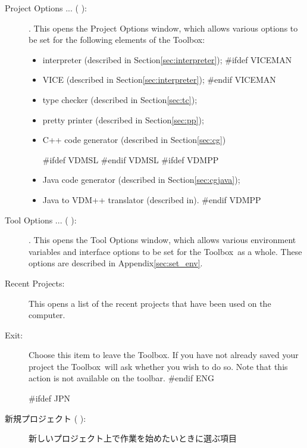 \documentclass[\pformat,12pt]{article}
\newcommand{\Toolbox}{Toolbox}
\newcommand{\Toolbox}{Toolbox}
\newcommand{\guicmd}[1]{{\sf #1}}
\newcommand{\guicmd}[1]{{\gt #1}}
\begin{document}
\begin{description}
\item[\guicmd{Project Options ...} (\hspace{-1.5mm}
):].
  This opens the \guicmd{Project Options} window, which allows various options
  to be set for the following elements of the \Toolbox:
  \begin{itemize}
    \item \guicmd{interpreter} (described in
  Section\ref{sec:interpreter});
#ifdef VICEMAN
    \item \guicmd{VICE} (described in
  Section\ref{sec:interpreter});
#endif VICEMAN
    \item \guicmd{type checker}  (described in Section\ref{sec:tc});
    \item \guicmd{pretty printer}  (described in Section\ref{sec:pp});
    \item \guicmd{C++ code generator} (described in Section\ref{sec:cg})%

#ifdef VDMSL
#endif VDMSL
#ifdef VDMPP
    \item \guicmd{Java code generator}  (described in Section\ref{sec:cgjava});
    \item \guicmd{Java to VDM++ translator}  (described in\cite{Java2VDMMan-CSK}). 
#endif VDMPP
  \end{itemize}

\item[\guicmd{Tool Options ...} (\hspace{-1.5mm}
):].
  This opens the \guicmd{Tool Options} window, which allows various
  environment variables and interface options to be set for the
  \Toolbox\ as a whole. These options are described in
  Appendix\ref{sec:set_env}. 

\item[\guicmd{Recent Projects}:]
  This opens a list of the recent projects that have been used on the
  computer.

\item[\guicmd{Exit}:] Choose this item to leave the \Toolbox. If you
  have not already saved your project the \Toolbox\ will ask whether
  you wish to do so. Note that this action is not available on the
  toolbar. 
#endif ENG

#ifdef JPN
\item[\guicmd{新規プロジェクト} (\hspace{-1.8mm}
):]
  新しいプロジェクト上で作業を始めたいときに選ぶ項目


\end{description}
\end{document}
